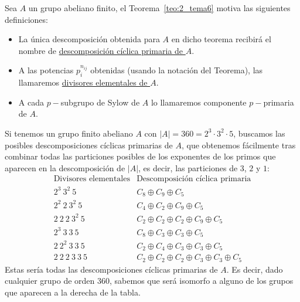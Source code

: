 \begin{definicion}
    Sea $A$ un grupo abeliano finito, el Teorema~\ref{teo:2_tema6} motiva las siguientes definiciones:
    \begin{itemize}
        \item La única descomposición obtenida para $A$ en dicho teorema recibirá el nombre de \underline{descomposición cíclica primaria de $A$}.
        \item A las potencias $p_i^{n_{ij}}$ obtenidas (usando la notación del Teorema), las llamaremos \underline{divisores elementales de $A$}.
        \item A cada $p-$subgrupo de Sylow de $A$ lo llamaremos componente $p-$primaria de $A$.
    \end{itemize}
\end{definicion}

\begin{ejemplo}
    Si tenemos un grupo finito abeliano $A$ con $|A| = 360 = 2^3\cdot 3^2\cdot 5$, buscamos las posibles descomposiciones cíclicas primarias de $A$, que obtenemos fácilmente tras combinar todas las particiones posibles de los exponentes de los primos que aparecen en la descomposición de $|A|$, es decir, las particiones de $3$, $2$ y $1$:
    \begin{equation*}
        \begin{array}{r|l}
            \text{Divisores elementales} & \text{Descomposición cíclica primaria} \\
            \hline
            2^3\ 3^2\ 5 & C_8\oplus C_9 \oplus C_5 \\
            2^2\ 2\ 3^2\ 5 & C_4\oplus C_2 \oplus C_9 \oplus C_5\\
            2\ 2\ 2\ 3^2\ 5 & C_2 \oplus C_2 \oplus C_2 \oplus C_9 \oplus C_5\\
            2^3\ 3\ 3\ 5 & C_8\oplus C_3 \oplus C_3 \oplus C_5 \\
            2\ 2^2\ 3\ 3\ 5 & C_2 \oplus C_4 \oplus C_3 \oplus C_3 \oplus C_5\\
            2\ 2\ 2\ 3\ 3\ 5 & C_2 \oplus C_2 \oplus C_2 \oplus C_3 \oplus C_3 \oplus C_5
        \end{array}
    \end{equation*}
    Estas sería todas las descomposiciones cíclicas primarias de $A$. Es decir, dado cualquier grupo de orden $360$, sabemos que será isomorfo a alguno de los grupos que aparecen a la derecha de la tabla.
\end{ejemplo}


